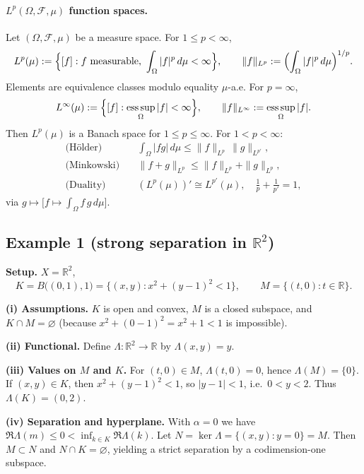 \documentclass[12pt,a4paper]{article}
\theoremstyle{plain}
\theoremstyle{definition}
\theoremstyle{remark}
\theoremstyle{remark}
\theoremstyle{definition}
\begin{document}
	\paragraph{$L^p(\Omega,\mathcal F,\mu)$ function spaces.}
	Let $(\Omega,\mathcal F,\mu)$ be a measure space. For $1\le p<\infty$,
	\[
	L^p(\mu) := \Bigl\{ [f] : f \text{ measurable},\ \int_\Omega |f|^p\,d\mu < \infty \Bigr\},
	\qquad
	\|f\|_{L^p} := \Bigl( \int_\Omega |f|^p\, d\mu \Bigr)^{1/p}.
	\]
	Elements are equivalence classes modulo equality $\mu$-a.e.
	For $p=\infty$,
	\[
	L^\infty(\mu) := \Bigl\{ [f] : \operatorname*{ess\,sup}_{\Omega} |f| < \infty \Bigr\},
	\qquad
	\|f\|_{L^\infty} := \operatorname*{ess\,sup}_{\Omega} |f|.
	\]
	Then $L^p(\mu)$ is a Banach space for $1\le p\le\infty$. For $1<p<\infty$:
	\begin{align*}
		\text{(H\"older)}\quad & \int_\Omega |fg|\,d\mu \le \|f\|_{L^p}\,\|g\|_{L^{p'}},\\
		\text{(Minkowski)}\quad & \|f+g\|_{L^p} \le \|f\|_{L^p}+\|g\|_{L^p},\\
		\text{(Duality)}\quad & (L^p(\mu))' \cong L^{p'}(\mu),\quad \tfrac1p+\tfrac1{p'}=1,
	\end{align*}
	via $g\mapsto \bigl[f\mapsto \int_\Omega f\,g\,d\mu\bigr]$.
	
	\subsection*{Example 1 (strong separation in $\mathbb R^2$)}
	
	\noindent\textbf{Setup.}
	$X=\mathbb R^2$, 
	\[
	K=B\big((0,1),1\big)=\{(x,y):x^2+(y-1)^2<1\},\qquad
	M=\{(t,0):t\in\mathbb R\}.
	\]
	
	\noindent\textbf{(i) Assumptions.}
	$K$ is open and convex, $M$ is a closed subspace, and $K\cap M=\varnothing$
	(because $x^2+(0-1)^2=x^2+1<1$ is impossible).
	
	\noindent\textbf{(ii) Functional.}
	Define $\Lambda:\mathbb R^2\to\mathbb R$ by $\Lambda(x,y)=y$.
	
	\noindent\textbf{(iii) Values on $M$ and $K$.}
	For $(t,0)\in M$, $\Lambda(t,0)=0$, hence $\Lambda(M)=\{0\}$.
	If $(x,y)\in K$, then $x^2+(y-1)^2<1$, so $|y-1|<1$, i.e.\ $0<y<2$.
	Thus $\Lambda(K)=(0,2)$.
	
	\noindent\textbf{(iv) Separation and hyperplane.}
	With $\alpha=0$ we have $\Re\Lambda(m)\le 0<\inf_{k\in K}\Re\Lambda(k)$.
	Let $N=\ker\Lambda=\{(x,y):y=0\}=M$.
	Then $M\subset N$ and $N\cap K=\varnothing$, yielding a strict separation by a codimension-one subspace.
	
\end{document}
